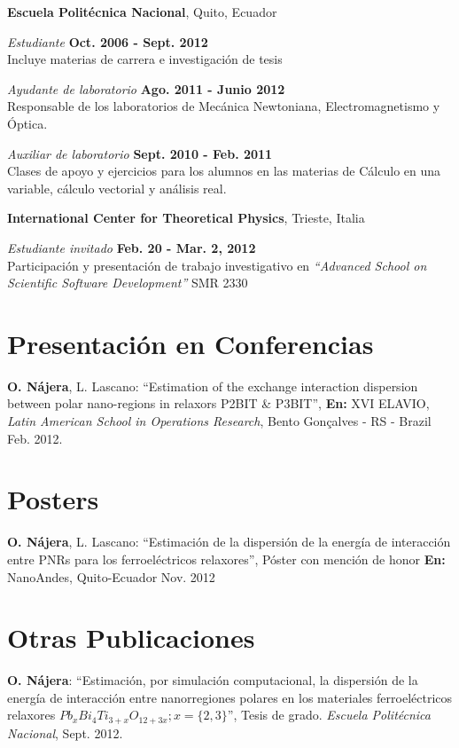 \documentclass[margin,line]{res}
\newenvironment{list1}{
  \begin{list}{\ding{113}}{%
      \setlength{\itemsep}{0in}
      \setlength{\parsep}{0in} \setlength{\parskip}{0in}
      \setlength{\topsep}{0in} \setlength{\partopsep}{0in} 
      \setlength{\leftmargin}{0.17in}}}{\end{list}}
\begin{document}
\begin{resume}
  {\bf Escuela Politécnica Nacional}, Quito, Ecuador
  \begin{list1}
   \item[] {\em Estudiante} \hfill {\bf Oct. 2006 - Sept. 2012}\\
    Incluye materias de carrera e investigación de tesis\\
   \item[] {\em Ayudante de laboratorio} \hfill {\bf Ago. 2011 - Junio 2012}\\
    Responsable de los laboratorios de Mecánica Newtoniana, Electromagnetismo y Óptica.\\
   \item[] {\em Auxiliar de laboratorio} \hfill {\bf Sept. 2010 - Feb. 2011}\\
    Clases de apoyo y ejercicios para los alumnos en las materias de Cálculo en una
    variable, cálculo vectorial y análisis real.
  \end{list1}

  {\bf International Center for Theoretical Physics}, Trieste, Italia
  \begin{list1}
    \item[] {\em Estudiante invitado} \hfill {\bf Feb. 20 - Mar. 2, 2012} \\
    Participación y presentación de trabajo investigativo en  {\em ``Advanced School on Scientific
    Software Development''} SMR 2330
  \end{list1}

\section{\sc Presentación en Conferencias}
  {\bf O. Nájera}, L. Lascano: ``Estimation of the exchange interaction dispersion between polar
  nano-regions in relaxors P2BIT \& P3BIT'', {\bf En:} XVI ELAVIO, {\em Latin American School in Operations Research}, Bento Gonçalves - RS - Brazil Feb. 2012.

\section{\sc Posters}
  {\bf O. Nájera}, L. Lascano: ``Estimación de la dispersión de la energía de interacción
  entre PNRs para los ferroeléctricos relaxores'',  Póster con mención de honor {\bf En:} NanoAndes, Quito-Ecuador Nov. 2012

\section{\sc Otras Publicaciones}
  {\bf O. Nájera}: ``Estimación, por simulación computacional, la dispersión de la energía de
  interacción entre nanorregiones polares en los materiales ferroeléctricos relaxores
  $Pb_xBi_4Ti_{3+x}O_{12+3x}; x=\{2,3\}$'', Tesis de grado. {\em Escuela Politécnica Nacional}, Sept. 2012.
  

\end{resume}
\end{document}
